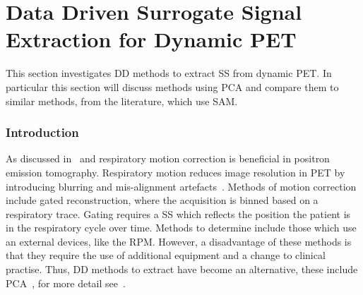 \chapter{Data Driven Surrogate Signal Extraction for Dynamic PET} \label{sec:data_driven_surrogate_signal_extraction_results}
    \newpage
    
        
    
        This section investigates \gls{DD} methods to extract \gls{SS} from dynamic \gls{PET}. In particular this section will discuss methods using \gls{PCA} and compare them to similar methods, from the literature, which use \gls{SAM}.
        
        \subsection{Introduction} \label{sec:pca_data_driven_surrogate_signal_extraction_methods_for_dynamic_pet_introduction}
            As discussed in~ and  respiratory motion correction is beneficial in positron emission tomography. Respiratory motion reduces image resolution in \gls{PET} by introducing blurring and mis-alignment artefacts~. Methods of motion correction include gated reconstruction, where the acquisition is binned based on a respiratory trace. Gating requires a \gls{SS} which reflects the position the patient is in the respiratory cycle over time. Methods to determine  include those which use an external devices, like the \gls{RPM}. However, a disadvantage of these methods is that they require the use of additional equipment and a change to clinical practise. Thus, \gls{DD} methods to extract  have become an alternative, these include \gls{PCA}~, for more detail see~. 
            
